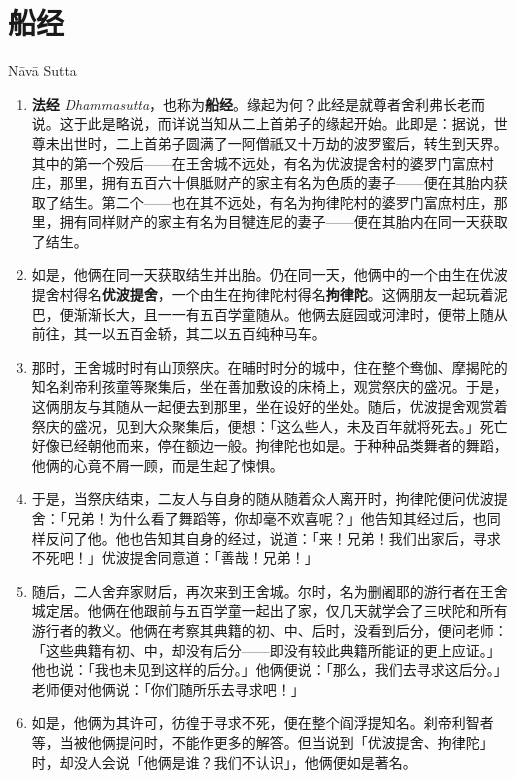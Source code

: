 \section{船经}

\begin{center}Nāvā Sutta\end{center}\vspace{1em}

\begin{enumerate}\item \textbf{法经} \textit{Dhammasutta}，也称为\textbf{船经}。缘起为何？此经是就尊者舍利弗长老而说。这于此是略说，而详说当知从二上首弟子的缘起开始。此即是：据说，世尊未出世时，二上首弟子圆满了一阿僧祇又十万劫的波罗蜜后，转生到天界。其中的第一个殁后——在王舍城不远处，有名为优波提舍村的婆罗门富庶村庄，那里，拥有五百六十俱胝财产的家主有名为色质的妻子——便在其胎内获取了结生。第二个——也在其不远处，有名为拘律陀村的婆罗门富庶村庄，那里，拥有同样财产的家主有名为目犍连尼的妻子——便在其胎内在同一天获取了结生。
\item 如是，他俩在同一天获取结生并出胎。仍在同一天，他俩中的一个由生在优波提舍村得名\textbf{优波提舍}，一个由生在拘律陀村得名\textbf{拘律陀}。这俩朋友一起玩着泥巴，便渐渐长大，且一一有五百学童随从。他俩去庭园或河津时，便带上随从前往，其一以五百金轿，其二以五百纯种马车。
\item 那时，王舍城时时有山顶祭庆。在晡时时分的城中，住在整个鸯伽、摩揭陀的知名刹帝利孩童等聚集后，坐在善加敷设的床椅上，观赏祭庆的盛况。于是，这俩朋友与其随从一起便去到那里，坐在设好的坐处。随后，优波提舍观赏着祭庆的盛况，见到大众聚集后，便想：「这么些人，未及百年就将死去。」死亡好像已经朝他而来，停在额边一般。拘律陀也如是。于种种品类舞者的舞蹈，他俩的心竟不屑一顾，而是生起了悚惧。
\item 于是，当祭庆结束，二友人与自身的随从随着众人离开时，拘律陀便问优波提舍：「兄弟！为什么看了舞蹈等，你却毫不欢喜呢？」他告知其经过后，也同样反问了他。他也告知其自身的经过，说道：「来！兄弟！我们出家后，寻求不死吧！」优波提舍同意道：「善哉！兄弟！」
\item 随后，二人舍弃家财后，再次来到王舍城。尔时，名为删阇耶的游行者在王舍城定居。他俩在他跟前与五百学童一起出了家，仅几天就学会了三吠陀和所有游行者的教义。他俩在考察其典籍的初、中、后时，没看到后分，便问老师：「这些典籍有初、中，却没有后分——即没有较此典籍所能证的更上应证。」他也说：「我也未见到这样的后分。」他俩便说：「那么，我们去寻求这后分。」老师便对他俩说：「你们随所乐去寻求吧！」
\item 如是，他俩为其许可，彷徨于寻求不死，便在整个阎浮提知名。刹帝利智者等，当被他俩提问时，不能作更多的解答。但当说到「优波提舍、拘律陀」时，却没人会说「他俩是谁？我们不认识」，他俩便如是著名。

\end{enumerate}
